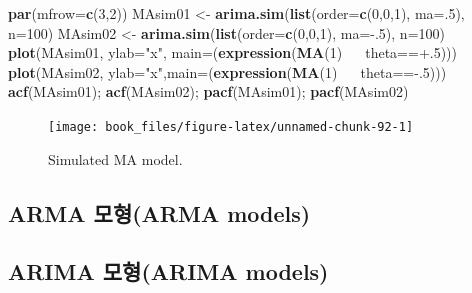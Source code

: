 \documentclass[b5paper,]{scrbook}
\makeatletter
\newenvironment{Shaded}{\begin{snugshade}}{\end{snugshade}}
\newcommand{\KeywordTok}[1]{\textcolor[rgb]{0.13,0.29,0.53}{\textbf{{#1}}}}
\newcommand{\DataTypeTok}[1]{\textcolor[rgb]{0.13,0.29,0.53}{{#1}}}
\newcommand{\DecValTok}[1]{\textcolor[rgb]{0.00,0.00,0.81}{{#1}}}
\newcommand{\StringTok}[1]{\textcolor[rgb]{0.31,0.60,0.02}{{#1}}}
\newcommand{\ErrorTok}[1]{\textcolor[rgb]{0.64,0.00,0.00}{\textbf{{#1}}}}
\newcommand{\NormalTok}[1]{{#1}}
\theoremstyle{plain}
\theoremstyle{definition}
\numberwithin{equation}{section}
\newenvironment{kframe}{%
\medskip{}
\setlength{\fboxsep}{.8em}
 \def\at@end@of@kframe{}%
 \ifinner\ifhmode%
  \def\at@end@of@kframe{\end{minipage}}%
  \begin{minipage}{\columnwidth}%
 \fi\fi%
 \def\FrameCommand##1{\hskip\@totalleftmargin \hskip-\fboxsep
 \colorbox{shadecolor}{##1}\hskip-\fboxsep
     \hskip-\linewidth \hskip-\@totalleftmargin \hskip\columnwidth}%
 \MakeFramed {\advance\hsize-\width
   \@totalleftmargin\z@ \linewidth\hsize
   \@setminipage}}%
 {\par\unskip\endMakeFramed%
 \at@end@of@kframe}
\renewenvironment{Shaded}{\begin{kframe}}{\end{kframe}}
\makeatother
\begin{document}
\begin{Shaded}
\begin{Highlighting}[]
\KeywordTok{par}\NormalTok{(}\DataTypeTok{mfrow=}\KeywordTok{c}\NormalTok{(}\DecValTok{3}\NormalTok{,}\DecValTok{2}\NormalTok{))   }
\NormalTok{MAsim01 <-}\StringTok{ }\KeywordTok{arima.sim}\NormalTok{(}\KeywordTok{list}\NormalTok{(}\DataTypeTok{order=}\KeywordTok{c}\NormalTok{(}\DecValTok{0}\NormalTok{,}\DecValTok{0}\NormalTok{,}\DecValTok{1}\NormalTok{), }\DataTypeTok{ma=}\NormalTok{.}\DecValTok{5}\NormalTok{), }\DataTypeTok{n=}\DecValTok{100}\NormalTok{)}
\NormalTok{MAsim02 <-}\StringTok{ }\KeywordTok{arima.sim}\NormalTok{(}\KeywordTok{list}\NormalTok{(}\DataTypeTok{order=}\KeywordTok{c}\NormalTok{(}\DecValTok{0}\NormalTok{,}\DecValTok{0}\NormalTok{,}\DecValTok{1}\NormalTok{), }\DataTypeTok{ma=}\NormalTok{-.}\DecValTok{5}\NormalTok{), }\DataTypeTok{n=}\DecValTok{100}\NormalTok{)}
\KeywordTok{plot}\NormalTok{(MAsim01, }\DataTypeTok{ylab=}\StringTok{"x"}\NormalTok{, }\DataTypeTok{main=}\NormalTok{(}\KeywordTok{expression}\NormalTok{(}\KeywordTok{MA}\NormalTok{(}\DecValTok{1}\NormalTok{)~}\ErrorTok{~~}\NormalTok{theta==+.}\DecValTok{5}\NormalTok{)))    }
\KeywordTok{plot}\NormalTok{(MAsim02, }\DataTypeTok{ylab=}\StringTok{"x"}\NormalTok{,}\DataTypeTok{main=}\NormalTok{(}\KeywordTok{expression}\NormalTok{(}\KeywordTok{MA}\NormalTok{(}\DecValTok{1}\NormalTok{)~}\ErrorTok{~~}\NormalTok{theta==-.}\DecValTok{5}\NormalTok{))) }
\KeywordTok{acf}\NormalTok{(MAsim01); }\KeywordTok{acf}\NormalTok{(MAsim02); }\KeywordTok{pacf}\NormalTok{(MAsim01); }\KeywordTok{pacf}\NormalTok{(MAsim02)}
\end{Highlighting}
\end{Shaded}

\begin{figure}

{\centering \texttt{[image: book\_files/figure-latex/unnamed-chunk-92-1]} 

}

\caption{Simulated MA model.}\label{fig:unnamed-chunk-92}
\end{figure}

\subsection{ARMA 모형(ARMA models)}\label{arma-arma-models}

\subsection{ARIMA 모형(ARIMA models)}\label{arima-arima-models}
\end{document}
